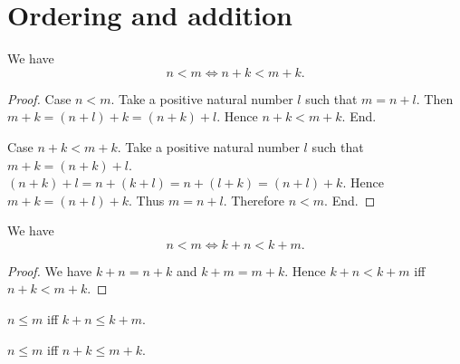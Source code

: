 \documentclass[../../natural-numbers.ftl.tex]{subfiles}
\begin{document}


  \section{Ordering and addition}

  \begin{forthel}
    \begin{proposition}[NN 02 02 179654]
      We have
      $$n < m \iff n + k < m + k.$$
    \end{proposition}
    \begin{proof}
      Case $n < m$.
        Take a positive natural number $l$ such that $m = n + l$.
        Then $m + k = (n + l) + k = (n + k) + l$.
        Hence $n + k < m + k$.
      End.

      Case $n + k < m + k$.
        Take a positive natural number $l$ such that $m + k = (n + k) + l$.
        $(n + k) + l = n + (k + l) = n + (l + k) = (n + l) + k$.
        Hence $m + k = (n + l) + k$.
        Thus $m = n + l$.
        Therefore $n < m$.
      End.
    \end{proof}


    \begin{corollary}[NN 02 02 316437]
      We have
      $$n < m \iff k + n < k + m.$$
    \end{corollary}
    \begin{proof}
      We have $k + n = n + k$ and $k + m = m + k$.
      Hence $k + n < k + m$ iff $n + k < m + k$.
    \end{proof}


    \begin{corollary}[NN 02 02 143631]
      $n \leq m$ iff $k + n \leq k + m$.
    \end{corollary}

    \begin{corollary}[NN 02 02 598206]
      $n \leq m$ iff $n + k \leq m + k$.
    \end{corollary}
  \end{forthel}
\end{document}
